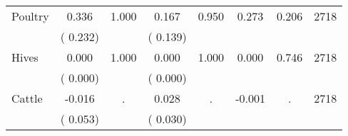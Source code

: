 \begin{tabular}{l*{7}{c}}
 Poultry       &              0.336       &        1.000  &              0.167       &        0.950  &              0.273       &              0.206 &  2718 \\ 
                       &       (       0.232)             &                               &       (       0.139)                     &                               &                                               &                                &                      \\ 

 Hives       &              0.000       &        1.000  &              0.000       &        1.000  &              0.000       &              0.746 &  2718 \\ 
                       &       (       0.000)             &                               &       (       0.000)                     &                               &                                               &                                &                      \\ 

 Cattle       &             -0.016       &            .  &              0.028       &            .  &             -0.001       &                  . &  2718 \\ 
                       &       (       0.053)             &                               &       (       0.030)                     &                               &                                               &                                &                      \\ 

\hline \end{tabular}